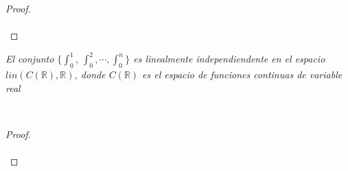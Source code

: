 \documentclass[11pt,letterpaper]{article}
\newcommand{\R}{\mathbb{R}}
\begin{document}
\begin{proof}\,\\
    \,\\
\end{proof}
\begin{tcolorbox}[
	title = \textcolor{black}{\textcolor{white}{Problema 15}},]
\textit{El conjunto $\{\int_{0}^1,\,\int_{0}^2,\cdots,\int_0^n\}$ es linealmente independiendente
en el espacio $lin(C(\R),\R)$, donde $C(\R)$ es el espacio de funciones continuas de variable real
}
\end{tcolorbox}\,\\
\begin{proof}\,\\
    \,\\
\end{proof}
\end{document}

